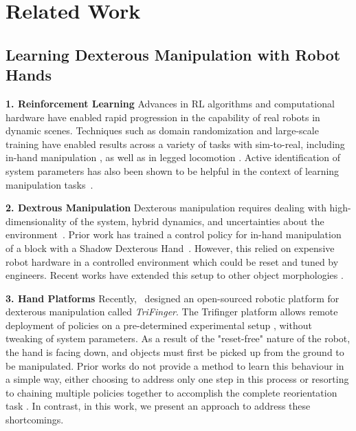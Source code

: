 \documentclass[letterpaper, 10 pt, conference]{ieeeconf}  %
\begin{document}

\vspace{-3pt}
\section{Related Work}
\vspace{-3pt}

\subsection{Learning Dexterous Manipulation with Robot Hands}

\noindent \textbf{1. Reinforcement Learning} Advances in RL algorithms and computational hardware have enabled rapid progression in the capability of real robots in dynamic scenes. Techniques such as domain randomization and large-scale training have enabled results across a variety of tasks with sim-to-real, including in-hand manipulation \citep{openai-sh, openai-rubiks}, as well as in legged locomotion \citep{Hwangbo_2019, shi2020circus}. Active identification of system parameters has also been shown to be helpful in the context of learning manipulation tasks~\citep{chebotar2019closing}.

\noindent \textbf{2. Dextrous Manipulation} Dexterous manipulation requires dealing with high-dimensionality of the system, hybrid dynamics, and uncertainties about the environment~\cite{okamura2000overview}. Prior work has trained a control policy for in-hand manipulation of a block with a Shadow Dexterous Hand~\cite{openai-sh}. However, this relied on expensive robot hardware in a controlled environment which could be reset and tuned by engineers.  Recent works have extended this setup to other object morphologies \citep{huang21, chen21}.

\noindent \textbf{3. Hand Platforms} Recently,~\citet{trifinger-platform} designed an open-sourced robotic platform for dexterous manipulation called \emph{TriFinger}. The Trifinger platform allows remote deployment of policies on a pre-determined experimental setup \citep{reproducible-cluster}, without tweaking of system parameters. As a result of the "reset-free" nature of the robot, the hand is facing down, and objects must first be picked up from the ground to be manipulated. Prior works do not provide a method to learn this behaviour in a simple way, either choosing to address only one step in this process or resorting to chaining multiple policies together to accomplish the complete reorientation task \citep{openai-sh, chen21}. In contrast, in this work, we present an approach to address these shortcomings.
\end{document}
